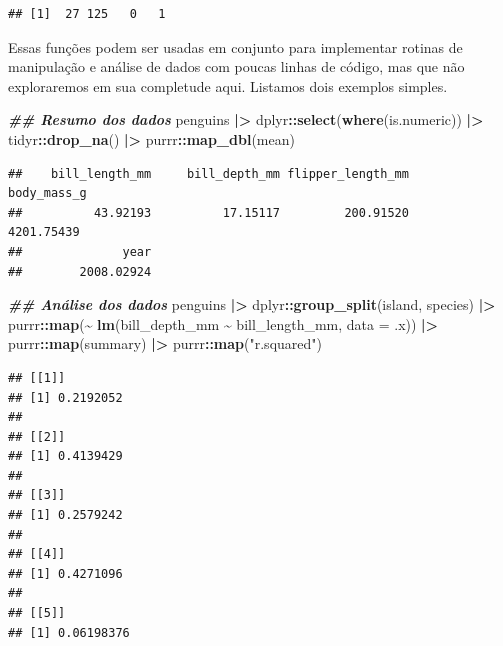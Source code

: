 \documentclass[
]{article}
\newenvironment{Shaded}{\begin{snugshade}}{\end{snugshade}}
\newcommand{\AttributeTok}[1]{\textcolor[rgb]{0.13,0.29,0.53}{#1}}
\newcommand{\DocumentationTok}[1]{\textcolor[rgb]{0.56,0.35,0.01}{\textbf{\textit{#1}}}}
\newcommand{\FunctionTok}[1]{\textcolor[rgb]{0.13,0.29,0.53}{\textbf{#1}}}
\newcommand{\NormalTok}[1]{#1}
\newcommand{\SpecialCharTok}[1]{\textcolor[rgb]{0.81,0.36,0.00}{\textbf{#1}}}
\newcommand{\StringTok}[1]{\textcolor[rgb]{0.31,0.60,0.02}{#1}}
\begin{document}
\begin{verbatim}
## [1]  27 125   0   1
\end{verbatim}

Essas funções podem ser usadas em conjunto para implementar rotinas de manipulação e análise de dados com poucas linhas de código, mas que não exploraremos em sua completude aqui. Listamos dois exemplos simples.

\begin{Shaded}
\begin{Highlighting}[]
\DocumentationTok{\#\# Resumo dos dados}
\NormalTok{penguins }\SpecialCharTok{|\textgreater{}} 
\NormalTok{    dplyr}\SpecialCharTok{::}\FunctionTok{select}\NormalTok{(}\FunctionTok{where}\NormalTok{(is.numeric)) }\SpecialCharTok{|\textgreater{}} 
\NormalTok{    tidyr}\SpecialCharTok{::}\FunctionTok{drop\_na}\NormalTok{() }\SpecialCharTok{|\textgreater{}} 
\NormalTok{    purrr}\SpecialCharTok{::}\FunctionTok{map\_dbl}\NormalTok{(mean)}
\end{Highlighting}
\end{Shaded}

\begin{verbatim}
##    bill_length_mm     bill_depth_mm flipper_length_mm       body_mass_g 
##          43.92193          17.15117         200.91520        4201.75439 
##              year 
##        2008.02924
\end{verbatim}

\begin{Shaded}
\begin{Highlighting}[]
\DocumentationTok{\#\# Análise dos dados}
\NormalTok{penguins }\SpecialCharTok{|\textgreater{}}
\NormalTok{    dplyr}\SpecialCharTok{::}\FunctionTok{group\_split}\NormalTok{(island, species) }\SpecialCharTok{|\textgreater{}} 
\NormalTok{    purrr}\SpecialCharTok{::}\FunctionTok{map}\NormalTok{(}\SpecialCharTok{\textasciitilde{}} \FunctionTok{lm}\NormalTok{(bill\_depth\_mm }\SpecialCharTok{\textasciitilde{}}\NormalTok{ bill\_length\_mm, }\AttributeTok{data =}\NormalTok{ .x)) }\SpecialCharTok{|\textgreater{}} 
\NormalTok{    purrr}\SpecialCharTok{::}\FunctionTok{map}\NormalTok{(summary) }\SpecialCharTok{|\textgreater{}} 
\NormalTok{    purrr}\SpecialCharTok{::}\FunctionTok{map}\NormalTok{(}\StringTok{"r.squared"}\NormalTok{)}
\end{Highlighting}
\end{Shaded}

\begin{verbatim}
## [[1]]
## [1] 0.2192052
## 
## [[2]]
## [1] 0.4139429
## 
## [[3]]
## [1] 0.2579242
## 
## [[4]]
## [1] 0.4271096
## 
## [[5]]
## [1] 0.06198376
\end{verbatim}
\end{document}

